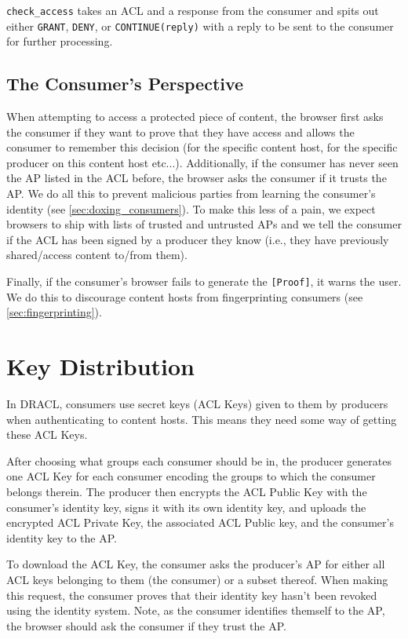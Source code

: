 \documentclass[pdftex,12pt,a4papaer,twoside,notitlepage]{report}
\begin{document}
\verb=check_access= takes an ACL and a response from the consumer and spits out
either \verb=GRANT=, \verb=DENY=, or \verb=CONTINUE(reply)= with a reply to be
sent to the consumer for further processing.

\subsection{The Consumer's Perspective}
\label{sec:consumer_perspective}

When attempting to access a protected piece of content, the browser first asks
the consumer if they want to prove that they have access and allows the consumer
to remember this decision (for the specific content host, for the specific
producer on this content host etc...). Additionally, if the consumer has never
seen the AP listed in the ACL before, the browser asks the consumer if it trusts
the AP. We do all this to prevent malicious parties from learning the consumer's
identity (see \cref{sec:doxing_consumers}). To make this less of a pain, we
expect browsers to ship with lists of trusted and untrusted APs and we tell the
consumer if the ACL has been signed by a producer they know (i.e., they have
previously shared/access content to/from them).

Finally, if the consumer's browser fails to generate the \verb=[Proof]=, it
warns the user. We do this to discourage content hosts from fingerprinting
consumers (see \cref{sec:fingerprinting}).

\section{Key Distribution}

In DRACL, consumers use secret keys (ACL Keys) given to them by producers when
authenticating to content hosts. This means they need some way of getting these
ACL Keys.

After choosing what groups each consumer should be in, the producer generates
one ACL Key for each consumer encoding the groups to which the consumer belongs
therein. The producer then encrypts the ACL Public Key with the consumer's
identity key, signs it with its own identity key, and uploads the encrypted ACL
Private Key, the associated ACL Public key, and the consumer's identity key to
the AP.

To download the ACL Key, the consumer asks the producer's AP for either all ACL
keys belonging to them (the consumer) or a subset thereof. When making this
request, the consumer proves that their identity key hasn't been revoked using
the identity system. Note, as the consumer identifies themself to the AP, the
browser should ask the consumer if they trust the AP.
\end{document}
